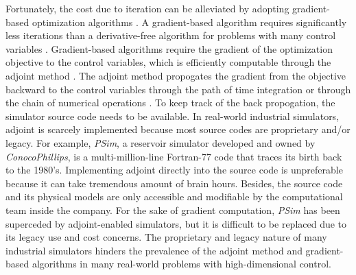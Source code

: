 Fortunately, the cost due to iteration can be alleviated by adopting gradient-based optimization algorithms \cite{opt via sim review}.
A gradient-based algorithm requires significantly less iterations than a derivative-free algorithm for problems with many control
variables \cite{intro adjoint, opt via sim review, gradfreereview}. Gradient-based algorithms require the gradient of the optimization objective to the control variables, which is efficiently 
computable through the adjoint method \cite{adjoint}. The adjoint method propogates the gradient from the objective 
backward to the control variables through the path of time integration \cite{adjoint} or through the chain of numerical operations \cite{AD review}. 
To keep track of the back propogation, the simulator source code needs to be available.
In real-world industrial simulators, adjoint is scarcely implemented because most source codes are proprietary and/or legacy.
For example, \textit{PSim}, a reservoir simulator developed and owned by \textit{ConocoPhillips}, 
is a multi-million-line Fortran-77 code that traces its birth back to the 1980's. 
Implementing adjoint directly into the source code is unpreferable because it can take tremendous amount of brain hours.
Besides, the source code and its physical models are only accessible and modifiable by the computational team inside the company. 
For the sake of gradient computation, \textit{PSim} has been superceded by adjoint-enabled simulators, but it is
difficult to be replaced due to its legacy use and cost concerns.
The proprietary and legacy nature of many industrial simulators hinders the prevalence of the adjoint method 
and gradient-based algorithms in many real-world problems with high-dimensional control.\\

